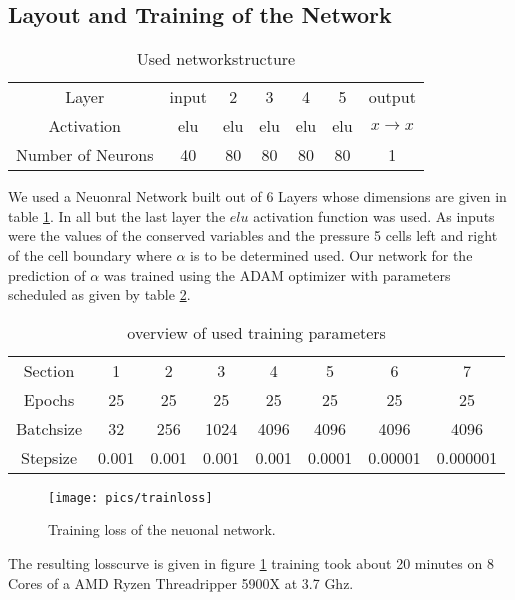 	\subsection{Layout and Training of the Network}
	\begin{table}
		\begin{tabular}{ccccccc}
			Layer 				& input & 2 	& 3 	& 4 	& 5 	& output\\
			Activation 			& elu 	& elu 	& elu 	& elu 	& elu 	& $x \to x$\\
			Number of Neurons 	& 40 	& 80 	& 80 	& 80 	& 80 	& 1\\
		\end{tabular}
	\caption{Used networkstructure}
	\label{tab:net}
	\end{table}
	We used a Neuonral Network built out of 6 Layers whose dimensions are given in table \ref{tab:net}. In all but the last layer the $elu$ activation function was used. As inputs were the values of the conserved variables and the pressure 5 cells left and right of the cell boundary where $\alpha$ is to be determined used.
	Our network for the prediction of $\alpha$ was trained using the ADAM optimizer \cite{kingma2017adam} with parameters scheduled as given by table \ref{tab:sched}.
	\begin{table}
		\begin{tabular}{cc cc cc cc}
			Section 	& 1 	& 2 	& 3 	& 4 	& 5 	& 6		& 7 \\
			Epochs 		& 25 	& 25 	& 25 	& 25 	& 25 	& 25 	& 25\\
			Batchsize 	& 32 	& 256 	& 1024 	& 4096 	& 4096 	& 4096  & 4096\\
			Stepsize  	&0.001 	& 0.001 & 0.001	& 0.001	& 0.0001& 0.00001& 0.000001\\
		\end{tabular}
		\caption{overview of used training parameters}
		\label{tab:sched}
	\end{table}
	\begin{figure}
	\texttt{[image: pics/trainloss]}
		\caption{Training loss of the neuonal network.}
		\label{fig:loss}
		\end{figure}
	The resulting losscurve is given in figure \ref{fig:loss} training took about 20 minutes on 8 Cores of a AMD Ryzen Threadripper 5900X at 3.7 Ghz. 
